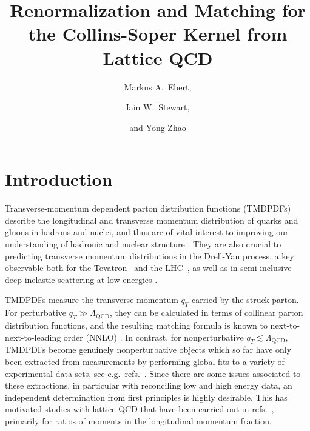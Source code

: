 \documentclass[11pt,a4paper]{article}
\title{Renormalization and Matching for the Collins-Soper Kernel from Lattice QCD}
\author[a]{Markus A.~Ebert,}
\author[a]{Iain W.~Stewart,}
\author[a,b]{and Yong Zhao}
\affiliation[a]{Center for Theoretical Physics, Massachusetts Institute of Technology, Cambridge, Massachusetts 02139, USA}
\affiliation[b]{Physics Department, Brookhaven National Laboratory, Bldg. 510A, Upton, NY 11973, USA}%
\DeclareRobustCommand{\mycites}[1]{refs.~\cite{#1}}
\newcommand{\LQCD}{\Lambda_\mathrm{QCD}}
\begin{document}
\maketitle


\section{Introduction}


Transverse-momentum dependent parton distribution functions (TMDPDFs) describe the longitudinal and transverse momentum distribution of quarks and gluons in hadrons and nuclei, and thus are of vital interest to improving our understanding of hadronic and nuclear structure \cite{Boer:2011fh,Accardi:2012qut}.
They are also crucial to predicting transverse momentum distributions in the Drell-Yan process, a key observable both for the Tevatron~\cite{Affolder:1999jh,Abbott:1999yd,Abazov:2007ac,Abazov:2010kn} and the LHC~\cite{Aad:2011gj,Chatrchyan:2011wt, Aad:2014xaa, Khachatryan:2015oaa, Aad:2015auj,  Khachatryan:2016nbe},
as well as in semi-inclusive deep-inelastic scattering at low energies \cite{Ashman:1991cj,Derrick:1995xg,Adloff:1996dy,Aaron:2008ad,Airapetian:2012ki,Adolph:2013stb,Aghasyan:2017ctw}.

TMDPDFs measure the transverse momentum $q_T$ carried by the struck parton.
For perturbative $q_T \gg \LQCD$, they can be calculated in terms of collinear parton distribution functions, and the resulting matching formula is known to next-to-next-to-leading order (NNLO) \cite{Catani:2011kr,Catani:2012qa,Gehrmann:2014yya,Luebbert:2016itl,Echevarria:2015byo,Echevarria:2016scs,Luo:2019hmp,Luo:2019bmw}.
In contrast, for nonperturbative $q_T \lesssim \LQCD$, TMDPDFs become genuinely nonperturbative objects which so far have only been extracted from measurements by performing global fits to a variety of experimental data sets, see e.g.~\mycites{Landry:1999an,Landry:2002ix,Konychev:2005iy,DAlesio:2014mrz,Bacchetta:2017gcc,Scimemi:2017etj}. Since there are some issues associated to these extractions, in particular with reconciling low and high energy data, an independent determination from first principles is highly desirable.
This has motivated studies with lattice QCD that have been carried out in \mycites{Musch:2010ka,Musch:2011er,Engelhardt:2015xja,Yoon:2016dyh,Yoon:2017qzo}, primarily for ratios of moments in the longitudinal momentum fraction.
\end{document}
